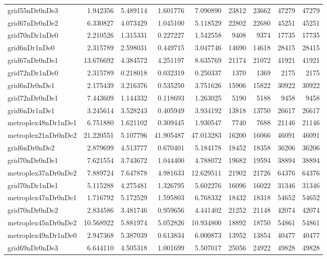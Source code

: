 \begin{longtable}{|l|r|r|r|r|r|r|r|r|}
grid55nDr0nDe3 & 1.942356 & 5.489114 & 1.601776 & 7.090890 & 23812 & 23662 & 47279 & 47279 \\
grid67nDr0nDe2 & 6.330827 & 4.073429 & 1.045100 & 5.118529 & 22802 & 22680 & 45251 & 45251 \\
grid70nDr1nDe0 & 2.210526 & 1.315331 & 0.227227 & 1.542558 & 9408 & 9374 & 17735 & 17735 \\
grid6nDr1nDe0 & 2.315789 & 2.598031 & 0.449715 & 3.047746 & 14690 & 14618 & 28415 & 28415 \\
grid67nDr0nDe1 & 13.676692 & 4.384572 & 4.251197 & 8.635769 & 21174 & 21072 & 41921 & 41921 \\
grid72nDr1nDe0 & 2.315789 & 0.218018 & 0.032319 & 0.250337 & 1370 & 1369 & 2175 & 2175 \\
grid6nDr0nDe1 & 2.175439 & 3.216376 & 0.535250 & 3.751626 & 15906 & 15822 & 30922 & 30922 \\
grid72nDr0nDe1 & 7.443609 & 1.144332 & 0.118693 & 1.263025 & 5190 & 5188 & 9458 & 9458 \\
grid6nDr1nDe1 & 3.245614 & 3.528243 & 0.405949 & 3.934192 & 13818 & 13750 & 26617 & 26617 \\
metroplex48nDr1nDe1 & 6.751880 & 1.621102 & 0.309445 & 1.930547 & 7740 & 7688 & 21146 & 21146 \\
metroplex21nDr0nDe2 & 21.220551 & 5.107796 & 41.905487 & 47.013283 & 16200 & 16066 & 46091 & 46091 \\
grid6nDr0nDe2 & 2.879699 & 4.513777 & 0.670401 & 5.184178 & 18452 & 18358 & 36206 & 36206 \\
grid70nDr0nDe1 & 7.621554 & 3.743672 & 1.044400 & 4.788072 & 19682 & 19594 & 38894 & 38894 \\
metroplex37nDr0nDe2 & 7.889724 & 7.647878 & 4.981633 & 12.629511 & 21902 & 21726 & 64376 & 64376 \\
grid70nDr1nDe1 & 5.115288 & 4.275481 & 1.326795 & 5.602276 & 16096 & 16022 & 31346 & 31346 \\
metroplex47nDr0nDe1 & 1.716792 & 5.172529 & 1.595803 & 6.768332 & 18432 & 18318 & 54652 & 54652 \\
grid70nDr0nDe2 & 2.834586 & 3.481746 & 0.959656 & 4.441402 & 21252 & 21148 & 42074 & 42074 \\
metroplex45nDr0nDe2 & 10.568922 & 5.881974 & 5.052826 & 10.934800 & 18892 & 18750 & 54861 & 54861 \\
metroplex49nDr1nDe0 & 2.947368 & 5.387039 & 0.613834 & 6.000873 & 13952 & 13854 & 40477 & 40477 \\
grid69nDr0nDe3 & 6.644110 & 4.505318 & 1.001699 & 5.507017 & 25056 & 24922 & 49828 & 49828 \\

\end{longtable}
